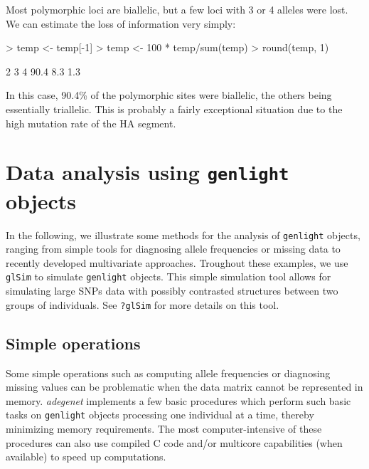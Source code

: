 \documentclass{article}
\begin{document}
Most polymorphic loci are biallelic, but a few loci with 3 or 4 alleles were lost.
We can estimate the loss of information very simply:
\begin{Schunk}
\begin{Sinput}
> temp <- temp[-1]
> temp <- 100 * temp/sum(temp)
> round(temp, 1)
\end{Sinput}
\begin{Soutput}
   2    3    4 
90.4  8.3  1.3 
\end{Soutput}
\end{Schunk}
In this case, 90.4\% of the polymorphic sites were biallelic, the others being
essentially triallelic.
This is probably a fairly exceptional situation due to the high mutation rate of the HA segment.










\section{Data analysis using \texttt{genlight} objects}

In the following, we illustrate some methods for the analysis of \texttt{genlight} objects, ranging
from simple tools for diagnosing allele frequencies or missing data to recently developed multivariate approaches.
Troughout these examples, we use \texttt{glSim} to simulate \texttt{genlight} objects.
This simple simulation tool allows for simulating large SNPs data with possibly contrasted
structures between two groups of individuals. See \texttt{?glSim} for more details on this tool.



\subsection{Simple operations}
Some simple operations such as computing allele frequencies or diagnosing missing values can be
problematic when the data matrix cannot be represented in memory.
\textit{adegenet} implements a few basic procedures which perform such basic tasks on
\texttt{genlight} objects processing one individual at a time, thereby minimizing memory
requirements. The most computer-intensive of these procedures can also use compiled C code and/or
multicore capabilities (when available) to speed up computations.
\\
\end{document}
